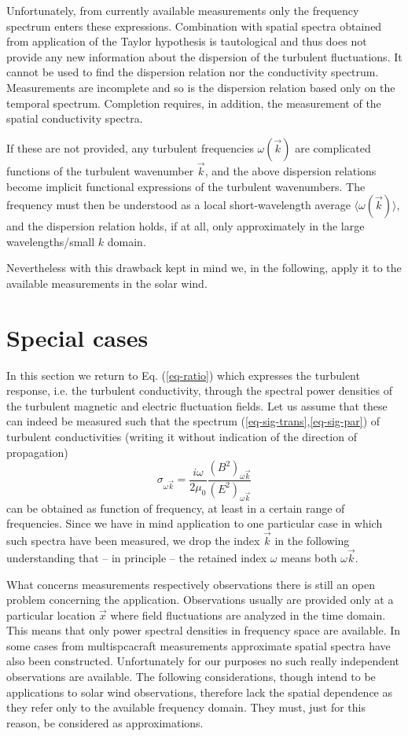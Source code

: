 \documentclass[ ]{copernicus2}
\begin{document}
{Unfortunately, from currently available measurements only the frequency spectrum enters these expressions. Combination with spatial spectra obtained from application of the Taylor hypothesis is tautological and thus does not provide any new information about the dispersion of the turbulent fluctuations. It cannot be used to find the dispersion relation nor the conductivity spectrum.  Measurements are incomplete and so is the dispersion relation based only on the temporal spectrum. Completion requires, in addition, the measurement of the spatial conductivity spectra. 

If these are not provided, any turbulent frequencies $\omega(\vec{k})$ are complicated functions of the turbulent wavenumber $\vec{k}$, and the above dispersion relations become implicit functional expressions of the turbulent wavenumbers. The frequency must then be understood as a local short-wavelength average $\langle\omega(\vec{k})\rangle$, and the dispersion relation holds, if at all, only approximately in the large wavelengths/small $k$ domain. 

Nevertheless with this drawback kept in mind we, in the following, apply it to the available measurements in the solar wind.

\section{Special cases}
In this section we return to Eq. (\ref{eq-ratio}) which expresses the turbulent response, i.e. the turbulent conductivity, through the spectral power densities of the turbulent magnetic and electric fluctuation fields. Let us assume that these can indeed be measured such that the spectrum (\ref{eq-sig-trans},\ref{eq-sig-par}) of turbulent conductivities (writing it without indication of the direction of propagation)
\begin{equation}\label{eq-sig-1}
\sigma_{\omega\vec{k}}=\frac{i\omega}{2\mu_0}\frac{(B^2)_{\omega\vec{k}}}{(E^2)_{\omega\vec{k}}}
\end{equation}
can be obtained  as function of frequency, at least in a certain range of frequencies. Since we have in mind application to one particular case in which such spectra have been measured, we drop the index $\vec{k}$ in the following understanding that -- in principle -- the retained index $\omega$ means both $\omega\vec{k}$. 

What concerns measurements respectively observations there is still an open problem concerning the application. Observations usually are provided only at a particular location $\vec{x}$  where field fluctuations are analyzed in the time domain. This means that only power spectral densities in frequency space are available. In some cases from multispcacraft measurements approximate spatial spectra have also been constructed. Unfortunately for our purposes no such really independent observations are available. The following considerations, though intend to be applications to solar wind observations, therefore lack the spatial dependence as they refer only to the available frequency domain. They must, just for this reason, be considered as approximations.

}
\end{document}
